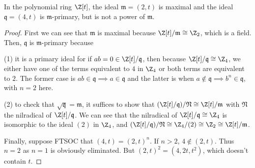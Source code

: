 \begin{exercise}
	In the polynomial ring $\Z[t] $, the ideal $\mathfrak{m}= (2,t) $ is maximal and the ideal $\mathfrak{q} = (4,t) $ is $\mathfrak{m} $-primary, but is not a power of $\mathfrak{m} $.
\end{exercise}
\begin{proof}
	First we can see that $\mathfrak{m} $ is maximal because $\Z[t] / \mathfrak{m} \cong \Z_2 $, which is a field.
	Then, $\mathfrak{q} $ is $\mathfrak{m} $-primary because 

	(1) it is a primary ideal for if $ab = 0 \in \Z[t] / \mathfrak{q} $, then because $\Z[t] / \mathfrak{q} \cong \Z_4 $, we either have one of the terms equivalent to $4 $ in $\Z_4 $ or both terms are equivalent to $2 $.
	The former case is $ab \in \mathfrak{q} \implies a \in \mathfrak{q} $ and the latter is when $a\notin \mathfrak{q} \implies b^n \in \mathfrak{q} $, with $n=2 $ here.

	(2) to check that $\sqrt{\mathfrak{q}}  = \mathfrak{m}$, it suffices to show that $(\Z[t] / \mathfrak{q}) / \mathfrak{N} \cong \Z[t] / \mathfrak{m} $ with $\mathfrak{N} $ the nilradical of $\Z[t] / \mathfrak{q} $.
	We can see that the nilradical of $\Z[t] / \mathfrak{q} \cong \Z_4 $ is isomorphic to the ideal $(2) $ in $\Z_4 $, and $(\Z[t] / \mathfrak{q}) / \mathfrak{N} \cong \Z_4 / (2) \cong \Z_2 \cong \Z[t] / \mathfrak{m}$.

	Finally, suppose FTSOC that $(4,t) = (2,t)^n $.
	If $n>2 $, $4 \notin (2,t) $.
	Thus $n=2 $ as $n=1 $ is obviously eliminated.
	But $(2,t)^2 = (4,2t,t^2) $, which doesn't contain $t $.
\end{proof}

